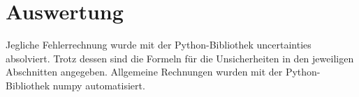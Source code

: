 \section{Auswertung}
\label{sec:Auswertung}
Jegliche Fehlerrechnung wurde mit der Python-Bibliothek uncertainties \cite{uncertainties} absolviert. Trotz dessen sind die Formeln für
die Unsicherheiten in den jeweiligen Abschnitten angegeben. Allgemeine Rechnungen wurden mit der Python-Bibliothek numpy \cite{numpy} automatisiert.